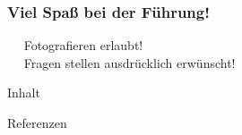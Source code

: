 \documentclass[10pt,t]{beamer}
\begin{document}
\begin{frame}
\begin{columns}
\end{columns}
\vspace*{-8pt}
\end{frame}



\begin{frame}
\frametitle{Viel Spaß bei der Führung!}
\textbullet~~ Fotografieren erlaubt! \\
\textbullet~~ Fragen stellen ausdrücklich erwünscht!
\end{frame}

\begin{frame}{Inhalt}
\tableofcontents
\end{frame}

\begin{frame}[allowframebreaks]{Referenzen}
\tiny{}

\end{frame}
\end{document}

